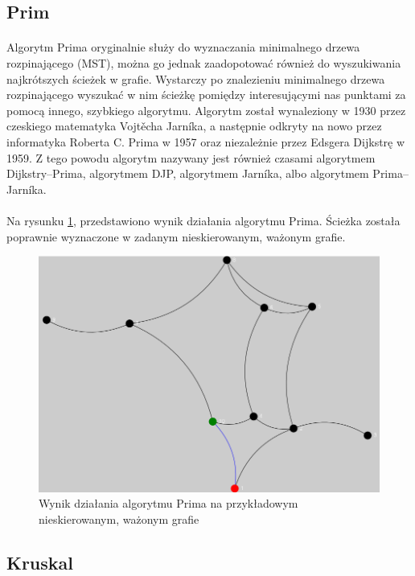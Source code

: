 \subsection{Prim}
\paragraph{}
Algorytm Prima oryginalnie służy do wyznaczania minimalnego drzewa rozpinającego (MST), można go jednak zaadopotować również do wyszukiwania najkrótszych ścieżek w grafie.
Wystarczy po znalezieniu minimalnego drzewa rozpinającego wyszukać w nim ścieżkę pomiędzy interesującymi nas punktami za pomocą innego, szybkiego algorytmu.
Algorytm został wynaleziony w 1930 przez czeskiego matematyka Vojtěcha Jarníka, a następnie odkryty na nowo przez informatyka Roberta C. Prima w 1957 oraz niezależnie przez Edsgera Dijkstrę w 1959. 
Z tego powodu algorytm nazywany jest również czasami algorytmem Dijkstry–Prima, algorytmem DJP, algorytmem Jarníka, albo algorytmem Prima–Jarníka.

\paragraph{}
Na rysunku \ref{fig:prim}, przedstawiono wynik działania algorytmu Prima. 
Ścieżka została poprawnie wyznaczone w zadanym nieskierowanym, ważonym grafie.
\begin{figure}[!h]
 \centering
 \includegraphics[width=1.0\textwidth]{algorithms/prim}
 \caption{Wynik działania algorytmu Prima na przykładowym nieskierowanym, ważonym grafie}
 \label{fig:prim}
\end{figure}

\subsection{Kruskal}
